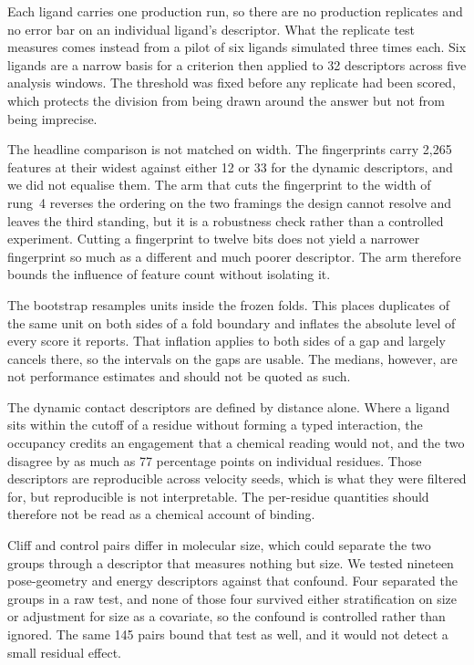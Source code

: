 Each ligand carries one production run, so there are no production replicates and no
error bar on an individual ligand's descriptor. What the replicate test measures comes
instead from a pilot of six ligands simulated three times each. Six ligands are a
narrow basis for a criterion then applied to 32 descriptors across five analysis
windows. The threshold was fixed before any replicate had been scored, which protects
the division from being drawn around the answer but not from being imprecise.

The headline comparison is not matched on width. The fingerprints carry 2{,}265
features at their widest against either 12 or 33 for the dynamic descriptors, and we
did not equalise them. The arm that cuts the fingerprint to the width of rung~4
reverses the ordering on the two framings the design cannot resolve and leaves the
third standing, but it is a robustness check rather than a controlled experiment.
Cutting a fingerprint to twelve bits does not yield a narrower fingerprint so much as a
different and much poorer descriptor. The arm therefore bounds the influence of feature
count without isolating it.

The bootstrap resamples units inside the frozen folds. This places duplicates of the
same unit on both sides of a fold boundary and inflates the absolute level of every
score it reports. That inflation applies to both sides of a gap and largely cancels
there, so the intervals on the gaps are usable. The medians, however, are not
performance estimates and should not be quoted as such.

The dynamic contact descriptors are defined by distance alone. Where a ligand sits within the
cutoff of a residue without forming a typed interaction, the occupancy credits an
engagement that a chemical reading would not, and the two disagree by as much as 77
percentage points on individual residues. Those descriptors are reproducible across
velocity seeds, which is what they were filtered for, but reproducible is not
interpretable. The per-residue quantities should therefore not be read as a chemical
account of binding.

Cliff and control pairs differ in molecular size, which could separate the two groups
through a descriptor that measures nothing but size. We tested nineteen pose-geometry
and energy descriptors against that confound. Four separated the groups in a raw test,
and none of those four survived either stratification on size or adjustment for size as
a covariate, so the confound is controlled rather than ignored. The same 145 pairs
bound that test as well, and it would not detect a small residual effect.
